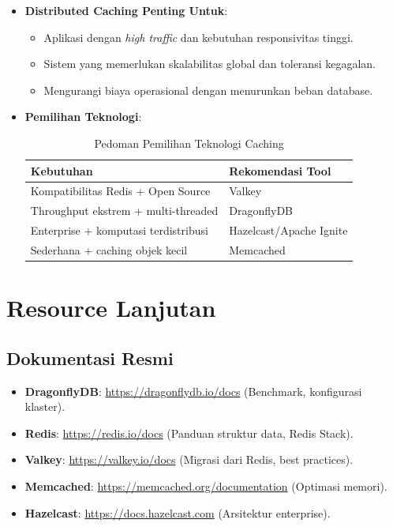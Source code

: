 \documentclass[11pt, a4paper]{book}
\begin{document}
	\begin{itemize}
		\item \textbf{Distributed Caching Penting Untuk}:  
		\begin{itemize}
			\item Aplikasi dengan \textit{high traffic} dan kebutuhan responsivitas tinggi.
			\item Sistem yang memerlukan skalabilitas global dan toleransi kegagalan.
			\item Mengurangi biaya operasional dengan menurunkan beban database.
		\end{itemize}
		
		\item \textbf{Pemilihan Teknologi}:  
		\begin{table}[htbp]
			\centering
			\caption{Pedoman Pemilihan Teknologi Caching}
			\label{tab:pemilihan-teknologi}
			\begin{tabularx}{\textwidth}{|l|X|}
				\hline
				\textbf{Kebutuhan} & \textbf{Rekomendasi Tool} \\ \hline
				Kompatibilitas Redis + Open Source & Valkey \\ \hline
				Throughput ekstrem + multi-threaded & DragonflyDB \\ \hline
				Enterprise + komputasi terdistribusi & Hazelcast/Apache Ignite \\ \hline
				Sederhana + caching objek kecil & Memcached \\ \hline
			\end{tabularx}
		\end{table}
	\end{itemize}
	
	\section{Resource Lanjutan}
	\label{sec:resource}
	
	\subsection{Dokumentasi Resmi}
	\label{subsec:dokumentasi}
	
	\begin{itemize}
		\item \textbf{DragonflyDB}:  
		\href{https://dragonflydb.io/docs}{https://dragonflydb.io/docs} (Benchmark, konfigurasi klaster).
		
		\item \textbf{Redis}:  
		\href{https://redis.io/docs}{https://redis.io/docs} (Panduan struktur data, Redis Stack).
		
		\item \textbf{Valkey}:  
		\href{https://valkey.io/docs}{https://valkey.io/docs} (Migrasi dari Redis, best practices).
		
		\item \textbf{Memcached}:  
		\href{https://memcached.org/documentation}{https://memcached.org/documentation} (Optimasi memori).
		
		\item \textbf{Hazelcast}:  
		\href{https://docs.hazelcast.com}{https://docs.hazelcast.com} (Arsitektur enterprise).
	\end{itemize}
	
\end{document}
